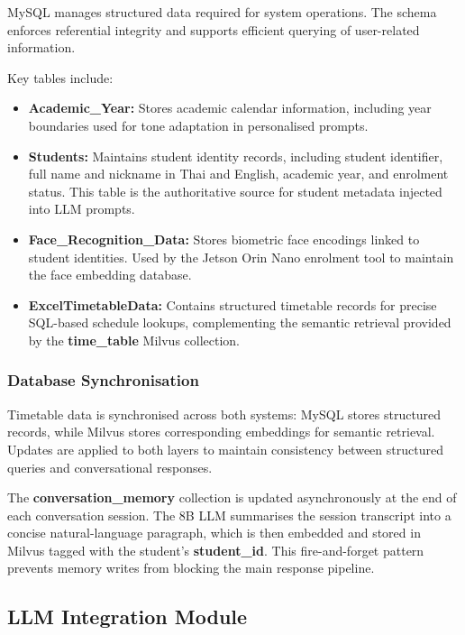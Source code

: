 MySQL manages structured data required for system operations. The schema enforces referential integrity and supports efficient querying of user-related information.

Key tables include:

\begin{itemize}
    \item \textbf{Academic\_Year:} Stores academic calendar information, including year boundaries used for tone adaptation in personalised prompts.

    \item \textbf{Students:} Maintains student identity records, including student identifier, full name and nickname in Thai and English, academic year, and enrolment status. This table is the authoritative source for student metadata injected into LLM prompts.

    \item \textbf{Face\_Recognition\_Data:} Stores biometric face encodings linked to student identities. Used by the Jetson Orin Nano enrolment tool to maintain the face embedding database.

    \item \textbf{ExcelTimetableData:} Contains structured timetable records for precise SQL-based schedule lookups, complementing the semantic retrieval provided by the \textbf{time\_table} Milvus collection.
\end{itemize}

\subsubsection{Database Synchronisation}

Timetable data is synchronised across both systems: MySQL stores structured records, while Milvus stores corresponding embeddings for semantic retrieval. Updates are applied to both layers to maintain consistency between structured queries and conversational responses.

The \textbf{conversation\_memory} collection is updated asynchronously at the end of each conversation session. The 8B LLM summarises the session transcript into a concise natural-language paragraph, which is then embedded and stored in Milvus tagged with the student's \textbf{student\_id}. This fire-and-forget pattern prevents memory writes from blocking the main response pipeline.

\subsection{LLM Integration Module}

